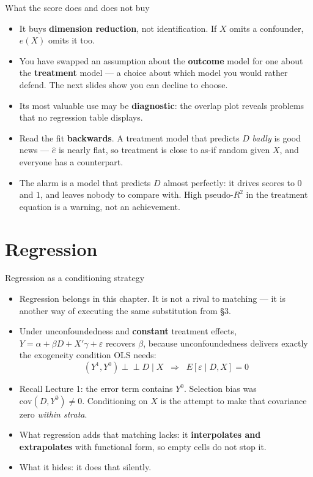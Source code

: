 \documentclass[
  11pt,
  ignorenonframetext,
  aspectratio=169,
]{beamer}
\providecommand{\tightlist}{%
  \setlength{\itemsep}{0pt}\setlength{\parskip}{0pt}}
\newcommand{\indep}{\perp\!\!\!\perp}
\begin{document}
\begin{frame}{What the score does and does not buy}
\protect{}\label{what-the-score-does-and-does-not-buy}
\begin{itemize}
\tightlist
\item
  It buys \textbf{dimension reduction}, not identification. If \(X\)
  omits a confounder, \(e(X)\) omits it too.
\item
  You have swapped an assumption about the \textbf{outcome} model for
  one about the \textbf{treatment} model --- a choice about which model
  you would rather defend. The next slides show you can decline to
  choose.
\item
  Its most valuable use may be \textbf{diagnostic}: the overlap plot
  reveals problems that no regression table displays.
\item
  Read the fit \textbf{backwards}. A treatment model that predicts \(D\)
  \emph{badly} is good news --- \(\hat e\) is nearly flat, so treatment
  is close to as-if random given \(X\), and everyone has a counterpart.
\item
  The alarm is a model that predicts \(D\) almost perfectly: it drives
  scores to \(0\) and \(1\), and leaves nobody to compare with. High
  pseudo-\(R^2\) in the treatment equation is a warning, not an
  achievement.
\end{itemize}
\end{frame}

\section{Regression}\label{regression}

\begin{frame}{Regression as a conditioning strategy}
\protect{}\label{regression-as-a-conditioning-strategy}
\begin{itemize}
\tightlist
\item
  Regression belongs in this chapter. It is not a rival to matching ---
  it is another way of executing the same substitution from §3.
\item
  Under unconfoundedness and \textbf{constant} treatment effects,
  \(Y = \alpha + \beta D + X'\gamma + \varepsilon\) recovers \(\beta\),
  because unconfoundedness delivers exactly the exogeneity condition OLS
  needs: \[
  (Y^1,Y^0)\indep D \mid X \;\;\Longrightarrow\;\; E[\varepsilon \mid D, X] = 0
  \]
\item
  Recall Lecture 1: the error term contains \(Y^0\). Selection bias was
  \(\mathrm{cov}(D, Y^0) \neq 0\). Conditioning on \(X\) is the attempt
  to make that covariance zero \emph{within strata}.
\item
  What regression adds that matching lacks: it \textbf{interpolates and
  extrapolates} with functional form, so empty cells do not stop it.
\item
  What it hides: it does that silently.
\end{itemize}
\end{frame}
\end{document}
